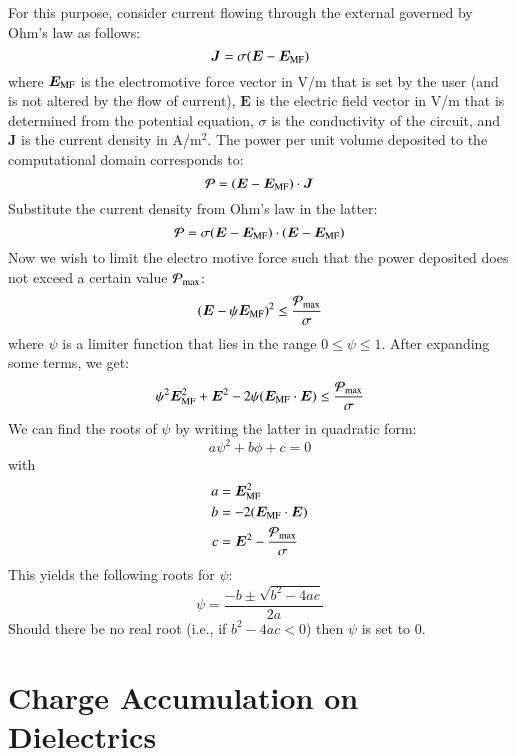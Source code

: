 \documentclass{warpdoc}
\newcommand{\alb}{\vspace{0.2cm}\\} %
\renewcommand{\vec}[1]{\bm{#1}}
\begin{document}
For this purpose, consider current flowing through the external governed by Ohm's law as follows:
%
\begin{equation}
 \vec{J}=\sigma (\vec{E} - \vec{E}_{\rm MF})
\end{equation}
%
where $\vec{E}_{\rm MF}$ is the electromotive force vector in V/m that is set by the user (and is not altered by the flow of current), $\vec{E}$ is the electric field vector in V/m that is determined from the potential equation, $\sigma$ is the conductivity of the circuit, and $\vec{J}$ is the current density in A/m$^2$. The power per unit volume deposited to the computational domain corresponds to:
%
\begin{equation}
 {\cal P}=(\vec{E} - \vec{E}_{\rm MF})\cdot \vec{J}
\end{equation}
%  
Substitute the current density from Ohm's law in the latter:
%
\begin{equation}
 {\cal P}=\sigma (\vec{E} - \vec{E}_{\rm MF})\cdot  (\vec{E} - \vec{E}_{\rm MF})
\end{equation}
%  
Now we wish to limit the electro motive force such that the power deposited does not exceed a certain value ${\cal P}_{\rm max}$:
%
\begin{equation}
    (\vec{E} - \psi\vec{E}_{\rm MF})^2 \leq \frac{{\cal P}_{\rm max}}{\sigma}
\end{equation}
% 
where $\psi$ is a limiter function that lies in the range $0\leq \psi \leq 1$. After expanding some terms, we get:
%
\begin{equation}
 \psi^2 \vec{E}_{\rm MF}^2 + \vec{E}^2 - 2 \psi (\vec{E}_{\rm MF}\cdot \vec{E} ) \leq \frac{{\cal P}_{\rm max}}{\sigma}
\end{equation}
% 
We can find the roots of $\psi$ by writing the latter in quadratic form:
%
\begin{equation}
  a \psi^2 + b \phi +c =0
\end{equation}
%
with
%
\begin{align}
  a&= \vec{E}_{\rm MF}^2 \alb
  b&= -2 (\vec{E}_{\rm MF} \cdot \vec{E}) \alb
  c&= \vec{E}^2 - \frac{{\cal P}_{\rm max}}{\sigma}
\end{align}
%
This yields the following roots for $\psi$:
%
\begin{equation}
  \psi=\frac{-b \pm \sqrt{b^2-4ac}}{2a}
\end{equation}
%
Should there be no real root (i.e., if $b^2-4ac<0$) then $\psi$ is set to 0. 


\section{Charge Accumulation on Dielectrics}
\end{document}
